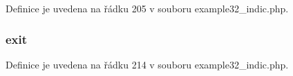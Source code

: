 Definice je uvedena na řádku 205 v souboru example32\-\_\-indic.\-php.

\hypertarget{example32__indic_8php_a6733eb5f605d09eaede9845835d71c4e}{
\subsubsection[{exit}]{\setlength{\rightskip}{0pt plus 5cm}exit}}\label{example32__indic_8php_a6733eb5f605d09eaede9845835d71c4e}


Definice je uvedena na řádku 214 v souboru example32\-\_\-indic.\-php.

